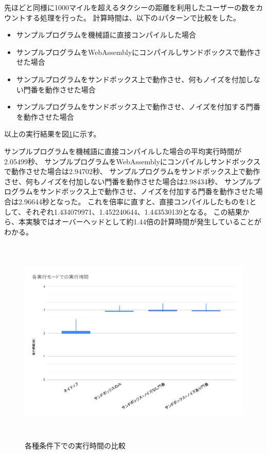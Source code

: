\documentclass[a4paper,11pt]{jreport}
\begin{document}
先ほどと同様に1000マイルを超えるタクシーの距離を利用したユーザーの数をカウントする処理を行った。
計算時間は、以下の4パターンで比較をした。
\begin{itemize}
    \item サンプルプログラムを機械語に直接コンパイルした場合
    \item サンプルプログラムをWebAssemblyにコンパイルしサンドボックスで動作させた場合
    \item サンプルプログラムをサンドボックス上で動作させ、何もノイズを付加しない門番を動作させた場合
    \item サンプルプログラムをサンドボックス上で動作させ、ノイズを付加する門番を動作させた場合
\end{itemize}

以上の実行結果を図\ref{fig:time}に示す。

サンプルプログラムを機械語に直接コンパイルした場合の平均実行時間が2.05499秒、
サンプルプログラムをWebAssemblyにコンパイルしサンドボックスで動作させた場合は2.94702秒、
サンプルプログラムをサンドボックス上で動作させ、何もノイズを付加しない門番を動作させた場合は2.98434秒、
サンプルプログラムをサンドボックス上で動作させ、ノイズを付加する門番を動作させた場合は2.96644秒となった。
これを倍率に直すと、直接コンパイルしたものを1として、それぞれ1.434079971、1.452240644、1.443530139となる。
この結果から、本実験ではオーバーヘッドとして約1.44倍の計算時間が発生していることがわかる。

\begin{figure}[htbp]
    \centering
\includegraphics[height=100mm]{time.png}
    \caption{各種条件下での実行時間の比較}
    \label{fig:time}
\end{figure}
\end{document}
